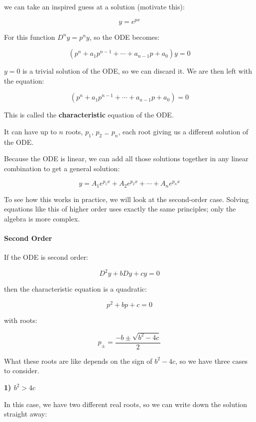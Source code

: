 we can take an inspired guess at a solution (motivate this):

$$y = e^{px}$$



For this function $D^n y = p^n y$, so the ODE becomes:

$$(p^n + a_1 p^{n-1} + \cdots + a_{n-1} p + a_0) y = 0$$



$y = 0$ is a trivial solution of the ODE, so we can discard it. We are then left with the equation:

$$(p^n + a_1 p^{n-1} + \cdots + a_{n-1} p + a_0) = 0$$

This is called the \textbf{characteristic} equation of the ODE.



It can have up to $n$ roots, $p_1$, $p_2$ … $p_n$, each root giving us a different solution of the ODE.



Because the ODE is linear, we can add all those solutions together in any linear combination to get a general solution:

$$y = A_1 e^{p_1 x} + A_2 e^{p_2 x} + \cdots + A_n e^{p_n x}$$



To see how this works in practice, we will look at the second-order case. Solving equations like this of higher order uses exactly the same principles; only the algebra is more complex.



\paragraph{Second Order}

If the ODE is second order:

$$D^2 y + b D y + c y = 0$$

then the characteristic equation is a quadratic:

$$p^2 + b p + c = 0$$

with roots:

$$p_{\pm} = \frac{-b \pm \sqrt{b^2 - 4c}}{2}$$



What these roots are like depends on the sign of $b^2 - 4c$, so we have three cases to consider.



\textbf{1) $b^2 > 4c$}



In this case, we have two different real roots, so we can write down the solution straight away:

